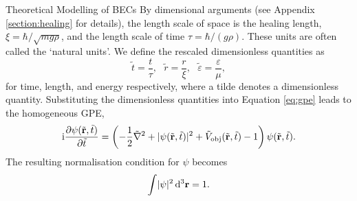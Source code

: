 \begin{chapter}{\label{cha:theoretical_model}Theoretical Modelling of BECs}
		By dimensional arguments (see Appendix \ref{section:healing} for details), the length scale of space is the healing length, $\xi = \hbar/\sqrt{mg\rho}$, and the length scale of time $\tau = \hbar/(g\rho)$. These units are often called the `natural units'. We define the rescaled dimensionless quantities as
		\begin{equation}
			\tilde{t} = \frac{t}{\tau}, ~~~ \tilde{r} = \frac{r}{\xi}, ~~~ \tilde{\varepsilon} = \frac{\varepsilon}{\mu},
		\end{equation}
		for time, length, and energy respectively, where a tilde denotes a dimensionless quantity. Substituting the dimensionless quantities into Equation \ref{eq:gpe} leads to the homogeneous GPE,
		\begin{equation}\label{eq:dimgpehomg}
		\mathrm{i}\frac{\partial\psi({\tilde{\bf r}},\tilde{t})}{\partial {\tilde{t}}} = \left( -\frac{1}{2}\tilde{\nabla}^2 + |\psi({\tilde{\bf r}},\tilde{t})|^2 + \tilde{V}_{\mathrm{obj}}({\tilde{\bf r}},\tilde{t}) - 1 \right) \psi({\tilde{\bf r}},\tilde{t}).
		\end{equation}
		The resulting normalisation condition for $\psi$ becomes
		\begin{equation}\label{eq:intwfhomg}
			\int \! |\psi|^2 \, \mathrm{d}^3{\bf r} = 1.
		\end{equation}


\end{chapter}
